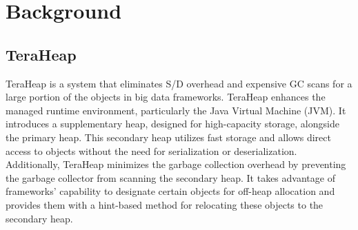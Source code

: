 \section{Background}

\vspace{1em}
\subsection{TeraHeap}
TeraHeap is a system that eliminates S/D overhead and expensive GC scans for a large portion of the objects in big data frameworks. TeraHeap enhances the managed runtime environment, particularly the Java Virtual Machine (JVM). It introduces a supplementary heap, designed for high-capacity storage, alongside the primary heap. This secondary heap utilizes fast storage and allows direct access to objects without the need for serialization or deserialization. Additionally, TeraHeap minimizes the garbage collection overhead by preventing the garbage collector from scanning the secondary heap. It takes advantage of frameworks' capability to designate certain objects for off-heap allocation and provides them with a hint-based method for relocating these objects to the secondary heap.
\vspace{1em}
